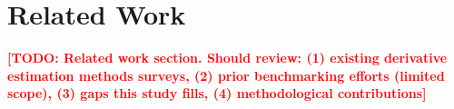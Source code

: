 \documentclass[11pt]{article}
\newcommand{\TODO}[1]{\textcolor{red}{\textbf{[TODO: #1]}}}
\begin{document}
\section{Related Work}
\label{sec:related_work}

\TODO{Related work section. Should review: (1) existing derivative estimation methods surveys, (2) prior benchmarking efforts (limited scope), (3) gaps this study fills, (4) methodological contributions}
















\end{document}
